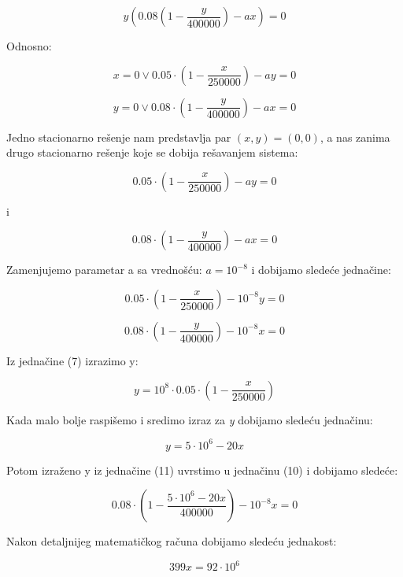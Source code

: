 \documentclass[a4paper]{article}
\begin{document}
{	\[
		y(0.08(1 - \frac{y}{400000}) - ax) = 0
	\]
	
	Odnosno: 
	
	\begin{equation}
		x = 0   \vee    0.05 \cdot (1 - \frac{x}{250000}) - ay = 0
	\end{equation}

	\begin{equation}
		y = 0   \vee    0.08 \cdot (1 - \frac{y}{400000}) - ax = 0
	\end{equation}
		
		
	Jedno stacionarno rešenje nam predstavlja par $(x, y) = (0, 0)$, a nas zanima drugo stacionarno rešenje koje se dobija rešavanjem sistema:
	
	\[
		0.05 \cdot (1 - \frac{x}{250000}) - ay = 0
	\]
	
	i 
	
	\[
		0.08 \cdot (1 - \frac{y}{400000}) - ax = 0
	\]
	
	Zamenjujemo parametar a sa vrednošću: $a = 10^{-8}$ i dobijamo sledeće jednačine:
	
	\begin{equation}
		0.05 \cdot (1 - \frac{x}{250000}) - 10^{-8} y = 0
	\end{equation}

	\begin{equation}
		0.08 \cdot (1 - \frac{y}{400000}) - 10^{-8} x = 0
	\end{equation}

	\newpage

	Iz jednačine (7) izrazimo y:
	
	\[
		y = 10^8 \cdot 0.05 \cdot (1 - \frac{x}{250000})
	\]

	Kada malo bolje raspišemo i sredimo izraz za \textit{y} dobijamo sledeću jednačinu: 
	
	\begin{equation}
		y = 5 \cdot 10^6 - 20x
	\end{equation}

	Potom izraženo y iz jednačine (11) uvrstimo u jednačinu (10) i dobijamo sledeće: 
	
	\[
		0.08 \cdot (1 - \frac{5 \cdot 10^6 - 20x}{400000}) - 10^{-8} x = 0  
	\]
	
	Nakon detaljnijeg matematičkog računa dobijamo sledeću jednakost:
	
	\begin{equation}
		399x = 92 \cdot 10^6
	\end{equation} 

}
\end{document}
